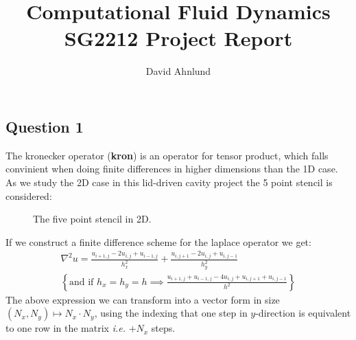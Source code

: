 \documentclass[10pt]{report}
\title{\huge{Computational Fluid Dynamics}\\\Large{SG2212 Project Report}}
\author{\LARGE{David Ahnlund}}
\date{}
\newcommand{\stencilpt}[4][]{\node[circle,fill=blue,draw=blue, label={[shift={(-0.4,-0.0)}]below:#4},#1] at (#2) (#3) {}}
\begin{document}
\maketitle
\newpage%
\pagestyle{fancy}

\subsection*{Question 1}
The kronecker operator (\textbf{kron}) is an operator for tensor product, which falls convinient
when doing finite differences in higher dimensions than the 1D case. As we study the 2D case in this
lid-driven cavity project the 5 point stencil is considered:


\begin{figure}[h]
    \centering
    
    \caption{The five point stencil in 2D.} 
    \label{fivepoint}  
\end{figure}
If we construct a finite difference scheme for the laplace operator we get:
\begin{gather}
    \nabla^2u = \frac{u_{i+1,j}-2u_{i,j}+u_{i-1,j}}{h_x^2} + \frac{u_{i,j+1}-2u_{i,j}+u_{i,j-1}}{h_y^2}\\
    \left\{  \text{and if }h_x = h_y = h \implies \frac{u_{i+1,j}+u_{i-1,j} -4u_{i,j}+ u_{i,j+1}+u_{i,j-1}}{h^2} \right\}
    \label{simplelap}
\end{gather}
The above expression we can transform into a vector form in size $(N_x, N_y) \mapsto N_x \cdot N_y$, using the indexing
that one step in $y$-direction is equivalent to one row in the matrix \textit{i.e.} $+N_x$ steps.
\end{document}
